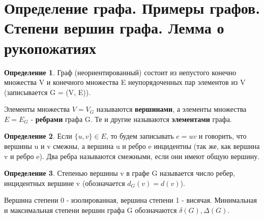 \documentclass[a4paper]{article}
\theoremstyle{definition}
\newtheorem*{definition}{Определение}
\theoremstyle{remark}
\begin{document}
    \tableofcontents
    \setcounter{page}{1}
    \section{Определение графа. Примеры графов. Степени вершин графа. Лемма о рукопожатиях}
    \begin{definition}
        Граф (неориентированный) состоит из непустого конечно множества V и конечного множества
        E неупорядоченных пар элементов из V (записывается G =  (V, E)).
    \end{definition}
    Элементы множества $V = V_G$ называются \textbf{вершинами}, а элементы множества $E = E_G$ - \textbf{ребрами} графа G.
    Те и другие называются \textbf{элементами} графа.
    \begin{definition}
        Если $\{u, v\}\in E$, то будем записывать $e = uv$ и говорить, что 
        вершины u и v смежны, а вершина u и ребро e инцидентны (так же, как вершина
        v и ребро e). Два ребра называются смежными, если они имеют общую вершину.
    \end{definition}
    \begin{definition}
        Степенью вершины v в графе G называется число ребер, инцидентных вершине v (обозначается $d_G(v) = d(v)$).
    \end{definition}
    Вершина степени 0 - изолированная, вершина степени 1 - висячая.
    Минимальная и максимальная степени вершин графа G обозначаются $\delta(G), \Delta(G)$.
\end{document}
